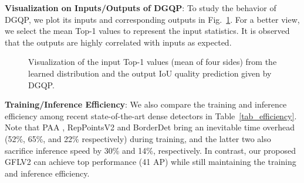 \documentclass[10pt,twocolumn,letterpaper]{article}
\begin{document}
\noindent \textbf{Visualization on Inputs/Outputs of DGQP}: To study the behavior of DGQP, we plot its inputs and corresponding outputs in Fig.~\ref{fig_analysis_subnetwork}. For a better view, we select the mean Top-1 values to represent the input statistics. It is observed that the outputs are highly correlated with inputs as expected.

\begin{figure}[t]
	\vspace{-6pt}
	\begin{center}
		\setlength{\fboxrule}{0pt}
	\end{center}	
	\vspace{-22pt}
	\caption{Visualization of the input Top-1 values (mean of four sides) from the learned distribution and the output IoU quality prediction given by DGQP.}
\label{fig_analysis_subnetwork}
	\vspace{-8pt}
\end{figure}

\noindent \textbf{Training/Inference Efficiency}: We also compare the training and inference efficiency among recent state-of-the-art dense detectors in Table~\ref{tab_efficiency}. Note that PAA \cite{kim2020probabilistic}, RepPointsV2 \cite{chen2020reppoints} and BorderDet \cite{qiu2020borderdet} bring an inevitable time overhead (52\%, 65\%, and 22\% respectively) during training, and the latter two also sacrifice inference speed by 30\% and 14\%, respectively. In contrast, our proposed GFLV2 can achieve top performance (41 AP) while still maintaining the training and inference efficiency.
\end{document}
